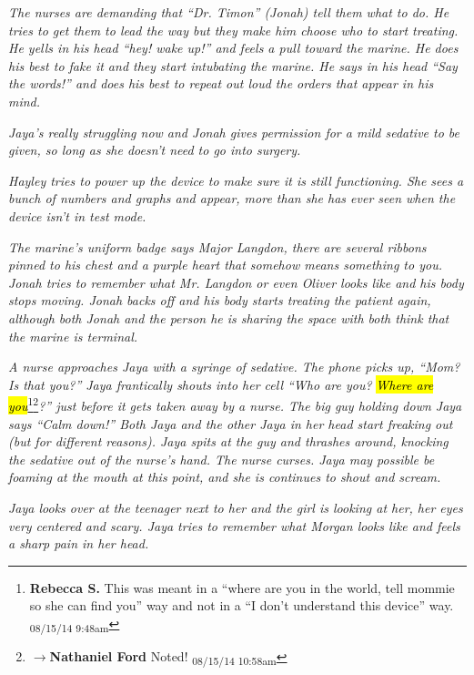 \textit{The nurses are demanding that ``Dr. Timon'' (Jonah) tell them what to do.  He tries to get them to lead the way but they make him choose who to start treating.  He yells in his head ``hey!  wake up!'' and feels a pull toward the marine.  He does his best to fake it and they start intubating the marine.  He says in his head ``Say the words!'' and does his best to repeat out loud the orders that appear in his mind.}



\textit{Jaya's really struggling now and Jonah gives permission for a mild sedative to be given, so long as she doesn't need to go into surgery.}



\textit{Hayley tries to power up the device to make sure it is still functioning.  She sees a bunch of numbers and graphs and appear, more than she has ever seen when the device isn't in test mode.}



\textit{The marine's uniform badge says Major Langdon, there are several ribbons pinned to his chest and a purple heart that somehow means something to you.  Jonah tries to remember what Mr. Langdon or even Oliver looks like and his body stops moving.  Jonah backs off and his body starts treating the patient again, although both Jonah and the person he is sharing the space with both think that the marine is terminal.}



\textit{A nurse approaches Jaya with a syringe of sedative.  The phone picks up, ``Mom? Is that you?''  Jaya frantically shouts into her cell ``Who are you? }\textit{\hl{Where are you}}\footnote{\textbf{Rebecca S. }This was meant in a ``where are you in the world, tell mommie so she can find you'' way and not in a ``I don't understand this device'' way. \textsubscript{08/15/14 9:48am}}\footnote{$\rightarrow$\textbf{Nathaniel Ford }Noted! \textsubscript{08/15/14 10:58am}}\textit{?'' just before it gets taken away by a nurse.  The big guy holding down Jaya says ``Calm down!''  Both Jaya and the other Jaya in her head start freaking out (but for different reasons).  Jaya spits at the guy and thrashes around, knocking the sedative out of the nurse's hand.  The nurse curses.  Jaya may possible be foaming at the mouth at this point, and she is continues to shout and scream. }



\textit{Jaya looks over at the teenager next to her and the girl is looking at her, her eyes very centered and scary.  Jaya tries to remember what Morgan looks like and feels a sharp pain in her head.  }



